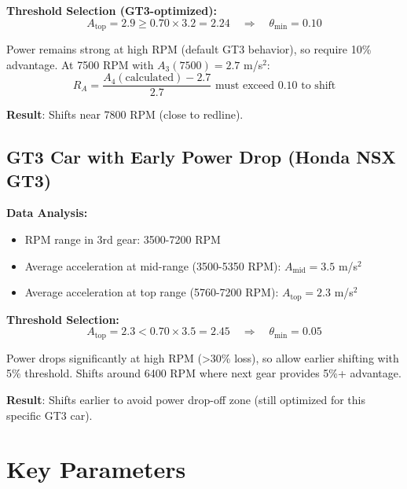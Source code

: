 \documentclass[12pt]{article}
\begin{document}
\textbf{Threshold Selection (GT3-optimized):}
\begin{equation}
A_{\text{top}} = 2.9 \geq 0.70 \times 3.2 = 2.24 \quad \Rightarrow \quad \theta_{\min} = 0.10
\end{equation}

Power remains strong at high RPM (default GT3 behavior), so require 10\% advantage. At 7500 RPM with $A_3(7500) = 2.7$ m/s$^2$:
\begin{equation}
R_A = \frac{A_4(\text{calculated}) - 2.7}{2.7} \text{ must exceed } 0.10 \text{ to shift}
\end{equation}

\textbf{Result}: Shifts near 7800 RPM (close to redline).

\subsection{GT3 Car with Early Power Drop (Honda NSX GT3)}

\textbf{Data Analysis:}
\begin{itemize}
    \item RPM range in 3rd gear: 3500-7200 RPM
    \item Average acceleration at mid-range (3500-5350 RPM): $A_{\text{mid}} = 3.5$ m/s$^2$
    \item Average acceleration at top range (5760-7200 RPM): $A_{\text{top}} = 2.3$ m/s$^2$
\end{itemize}

\textbf{Threshold Selection:}
\begin{equation}
A_{\text{top}} = 2.3 < 0.70 \times 3.5 = 2.45 \quad \Rightarrow \quad \theta_{\min} = 0.05
\end{equation}

Power drops significantly at high RPM (>30\% loss), so allow earlier shifting with 5\% threshold. Shifts around 6400 RPM where next gear provides 5\%+ advantage.

\textbf{Result}: Shifts earlier to avoid power drop-off zone (still optimized for this specific GT3 car).

\section{Key Parameters}
\end{document}
